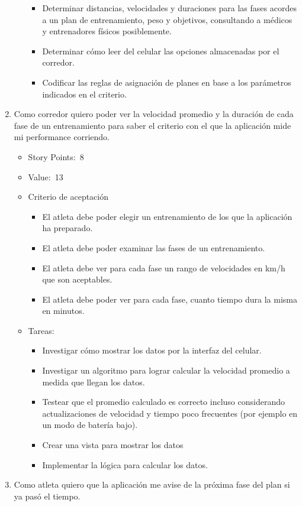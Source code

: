 \begin{enumerate}
\begin{itemize}
    \begin{itemize}
    \item
      Determinar distancias, velocidades y duraciones para las fases
      acordes a un plan de entrenamiento, peso y objetivos, consultando
      a médicos y entrenadores físicos posiblemente.
    \item
      Determinar cómo leer del celular las opciones almacenadas por el
      corredor.
    \item
      Codificar las reglas de asignación de planes en base a los
      parámetros indicados en el criterio.
    \end{itemize}
  \end{itemize}
\item
  Como corredor quiero poder ver la velocidad promedio y la duración de
  cada fase de un entrenamiento para saber el criterio con el que la
  aplicación mide mi performance corriendo.

  \begin{itemize}
  \item
    Story Points:~8
  \item
    Value:~13
  \item
    Criterio de aceptación

    \begin{itemize}
    \item
      El atleta debe poder elegir un entrenamiento de los que la
      aplicación ha preparado.
    \item
      El atleta debe poder examinar las fases de un entrenamiento.
    \item
      El atleta debe ver para cada fase un rango de velocidades en km/h
      que son aceptables.
    \item
      El atleta debe poder ver para cada fase, cuanto tiempo dura la
      misma en minutos.
    \end{itemize}
  \item
    Tareas:

    \begin{itemize}
    \item
      Investigar cómo mostrar los datos por la interfaz del celular.
    \item
      Investigar un algoritmo para lograr calcular la velocidad promedio
      a medida que llegan los datos.
    \item
      Testear que el promedio calculado es correcto incluso considerando
      actualizaciones de velocidad y tiempo poco frecuentes (por ejemplo
      en un modo de batería bajo).
    \item
      Crear una vista para mostrar los datos
    \item
      Implementar la lógica para calcular los datos.
    \end{itemize}
  \end{itemize}
\item
  Como atleta quiero que la aplicación me avise de la próxima fase del
  plan si ya pasó el tiempo.


\end{enumerate}
